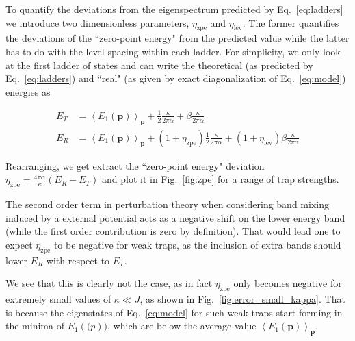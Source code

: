 \documentclass[twocolumn, 10pt, aps, superscriptaddress, floatfix, showpacs, prb, citeautoscript]{revtex4-1}
\newcommand{\vt}[1]{\mathbf{#1}}
\newcommand{\co}[2]{#2}
\renewcommand{\paragraph}{\co}
\begin{document}
To quantify the deviations from the eigenspectrum predicted by
Eq.~\eqref{eq:ladders} we introduce two dimensionless parameters,
$\eta_{\text{zpe}}$ and $\eta_{\text{lev}}$. The former quantifies the
deviations of the ``zero-point energy" from the predicted value while the
latter has to do with the level spacing within each ladder. For
simplicity, we only look at the first ladder of states and can write
the theoretical (as predicted by Eq.~\eqref{eq:ladders}) and ``real"
(as given by exact diagonalization of Eq.~\eqref{eq:model}) energies as

\begin{subequations}
  \begin{align}
    E_T &= \left<E_1(\vt{p})\right>_{\vt{p}} + \frac{1}{2}\frac{\kappa}{2\pi\alpha} + \beta \frac{\kappa}{2\pi\alpha}\\
    E_R &= \left<E_1(\vt{p})\right>_{\vt{p}} +
          (1+\eta_{\text{zpe}})\frac{1}{2}\frac{\kappa}{2\pi\alpha} +
          (1+\eta_{\text{lev}})\beta \frac{\kappa}{2\pi\alpha}
  \end{align}   
\end{subequations}


Rearranging, we get extract the ``zero-point energy" deviation
$\eta_{\text{zpe}} = \frac{4\pi\alpha}{\kappa} (E_R - E_T)$ and plot
it in Fig.~\ref{fig:zpe} for a range of trap strengths.

\paragraph{There is a positive contribution to the zero point energy error.}  
The second order term in perturbation theory when considering band
mixing induced by a external potential acts as a negative shift on the
lower energy band (while the first order contribution is zero by
definition). That would lead one to expect $\eta_{\text{zpe}}$ to be
negative for weak traps, as the inclusion of extra bands should lower
$E_R$ with respect to $E_T$.

\paragraph{Eigenstates for weak traps form in the minima of the band dispersion.}
We see that this is clearly not the case, as in fact
$\eta_{\text{zpe}}$ only becomes negative for extremely small values
of $\kappa \ll J$, as shown in Fig.~\ref{fig:error_small_kappa}.  That
is because the eigenstates of Eq.~\eqref{eq:model} for such weak
traps start forming in the minima of $E_1(\vt(p))$, which are below
the average value $\left<E_1(\vt{p})\right>_{\vt{p}}$.
\end{document}
